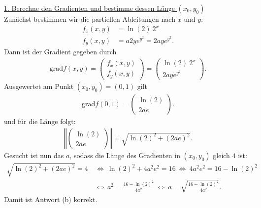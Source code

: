 \underline{1. Berechne den Gradienten und bestimme dessen Länge $(x_0,y_0)$}\\
Zunächst bestimmen wir die partiellen Ableitungen nach $x$ und $y$:
\begin{align*}
	f_x(x,y)
	&=
	\ln(2) \ 2^x\\
	f_y(x,y)
	&=
	a 2y e^{y^2} 
	=
	2ay e^{y^2}.  
\end{align*}
Dann ist der Gradient gegeben durch
\begin{align*}
	\mathrm{grad} f(x,y)
	=
	\begin{pmatrix}
		f_x(x,y) \\
		f_y(x,y)
	\end{pmatrix}
	=
	\begin{pmatrix}
		\ln(2) \ 2^x \\
		2ay e^{y^2}
	\end{pmatrix}.
\end{align*}
Ausgewertet am Punkt $(x_0,y_0) = (0,1)$ gilt
\begin{align*}
	\mathrm{grad} f(0,1)
	=
	\begin{pmatrix}
		\ln(2) \\
		2a e
	\end{pmatrix}.
\end{align*}
und für die Länge folgt:
\begin{align*}
	\left\Vert
	\begin{pmatrix}
		\ln (2) \\
		2a e
	\end{pmatrix}
	\right\Vert
	= 
	\sqrt{\ln(2)^2 + (2ae)^2}.
\end{align*}
Gesucht ist nun das $a$, sodass die Länge des Gradienten in $(x_0,y_0)$ gleich $4$ ist:
\begin{align*}
	\sqrt{\ln(2)^2 + (2ae)^2} = 4
	\ &\Leftrightarrow \
	\ln(2)^2 + 4 a^2e^2 = 16
	\ \Leftrightarrow \
	4 a^2 e^2 = 16 - \ln(2)^2\\
	\ &\Leftrightarrow \
	a^2 = \frac{16 - \ln(2)^2}{4 a^2}
	\ \Leftrightarrow \
	a = \sqrt{\frac{16 - \ln(2)^2}{4 a^2}}.
\end{align*} 
Damit ist Antwort (b) korrekt.



\newpage
